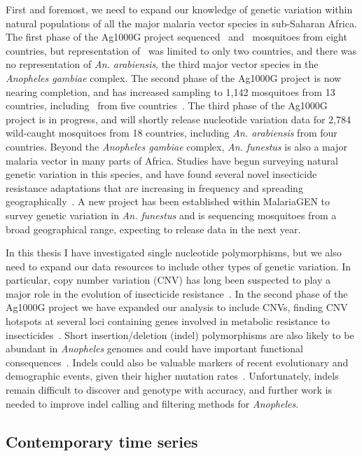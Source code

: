 \begin{refsection}
First and foremost, we need to expand our knowledge of genetic variation within natural populations of all the major malaria vector species in sub-Saharan Africa.
%
The first phase of the Ag1000G project sequenced \agam\ and \acol\ mosquitoes from eight countries, but representation of \acol\ was limited to only two countries, and there was no representation of \textit{An. arabiensis}, the third major vector species in the \textit{Anopheles gambiae} complex.
%
The second phase of the Ag1000G project is now nearing completion, and has increased sampling to 1,142 mosquitoes from 13 countries, including \acol\ from five countries~\parencite{Ag1000G2020}.
%
The third phase of the Ag1000G project is in progress, and will shortly release nucleotide variation data for 2,784 wild-caught mosquitoes from 18 countries, including \textit{An. arabiensis} from four countries.
%
Beyond the \textit{Anopheles gambiae} complex, \textit{An. funestus} is also a major malaria vector in many parts of Africa.
%
Studies have begun surveying natural genetic variation in this species, and have found several novel insecticide resistance adaptations that are increasing in frequency and spreading geographically~\parencite{Weedall2020}.
%
A new project has been established within MalariaGEN to survey genetic variation in \textit{An. funestus} and is sequencing mosquitoes from a broad geographical range, expecting to release data in the next year.


In this thesis I have investigated single nucleotide polymorphisms, but we also need to expand our data resources to include other types of genetic variation.
%
In particular, copy number variation (CNV) has long been suspected to play a major role in the evolution of insecticide resistance~\parencite{Devonshire1991,Hemingway1998,Bass2011}.
%
In the second phase of the Ag1000G project we have expanded our analysis to include CNVs, finding CNV hotspots at several loci containing genes involved in metabolic resistance to insecticides~\parencite{Lucas2019}.
%
Short insertion/deletion (indel) polymorphisms are also likely to be abundant in \textit{Anopheles} genomes and could have important functional consequences~\parencite{Montgomery2013}.
%
Indels could also be valuable markers of recent evolutionary and demographic events, given their higher mutation rates~\parencite{Redmond2018}.
%
Unfortunately, indels remain difficult to discover and genotype with accuracy, and further work is needed to improve indel calling and filtering methods for \textit{Anopheles}.


\subsection{Contemporary time series}



\end{refsection}
